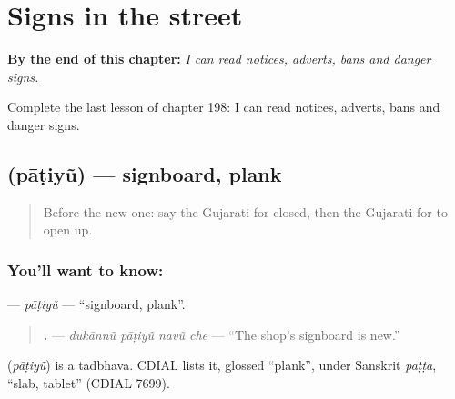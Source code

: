 
\chapter{Signs in the street}
\label{ch:gu-signs-in-the-street}

\begin{chapteropening}
\textbf{By the end of this chapter:} \emph{I can read notices, adverts, bans and danger signs.}

Complete the last lesson of chapter 198: I can read notices, adverts, bans and danger signs.
\end{chapteropening}

\section[\texorpdfstring{\gu{પાટિયું} (pāṭiyũ)}{પાટિયું (pāṭiyũ)}]{ (pāṭiyũ) — signboard, plank}

\label{lesson:GU-C198-patiyu}



\begin{quote}
Before the new one: say the Gujarati for closed, then the Gujarati for to open up.
\end{quote}

\subsection*{You'll want to know: }
\textbf{} — \emph{pāṭiyũ} — \textquotedblleft{}signboard, plank\textquotedblright{}.

\begin{quote}
\textbf{   .} — \emph{dukānnũ pāṭiyũ navũ che} — \textquotedblleft{}The shop's signboard is new.\textquotedblright{}
\end{quote}

\begin{cousinweb}
\textbf{} (\emph{pāṭiyũ}) is a tadbhava. CDIAL lists it, glossed \textquotedblleft{}plank\textquotedblright{}, under Sanskrit \emph{paṭṭa}, \textquotedblleft{}slab, tablet\textquotedblright{} (CDIAL 7699).
\end{cousinweb}

